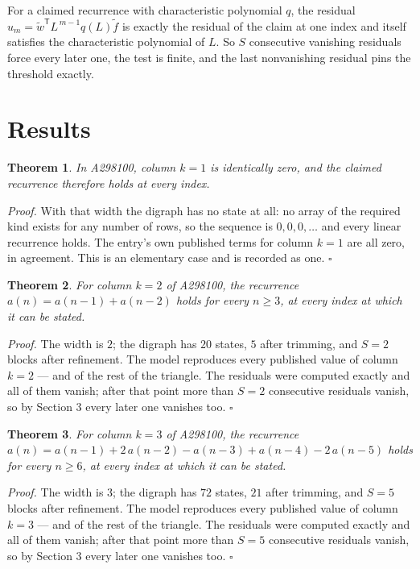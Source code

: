 \documentclass[11pt]{article}
\newtheorem{theorem}{Theorem}
\theoremstyle{definition}
\begin{document}
For a claimed recurrence with characteristic polynomial $q$, the residual $u_m = \tilde w^{\mathsf T}L^{\,m-1}q(L)\tilde f$ is exactly the residual of the claim at one index and itself satisfies the characteristic polynomial of $L$. So $S$ consecutive vanishing residuals force every later one, the test is finite, and the last nonvanishing residual pins the threshold exactly.

\section{Results}

\begin{theorem} In A298100, column $k = 1$ is identically zero, and the claimed recurrence therefore holds at every index.\end{theorem}

{\itshape Proof.} With that width the digraph has no state at all: no array of the required kind exists for any number of rows, so the sequence is $0,0,0,\dots$ and every linear recurrence holds. The entry's own published terms for column $k = 1$ are all zero, in agreement. This is an elementary case and is recorded as one. $\square$

\begin{theorem} For column $k = 2$ of A298100, the recurrence $a(n) = a(n-1) + a(n-2)$ holds for every $n \ge 3$, at every index at which it can be stated.\end{theorem}

{\itshape Proof.} The width is $2$; the digraph has $20$ states, $5$ after trimming, and $S = 2$ blocks after refinement. The model reproduces every published value of column $k = 2$ --- and of the rest of the triangle. The residuals were computed exactly and all of them vanish; after that point more than $S = 2$ consecutive residuals vanish, so by Section 3 every later one vanishes too. $\square$

\begin{theorem} For column $k = 3$ of A298100, the recurrence $a(n) = a(n-1) + 2\,a(n-2) - a(n-3) + a(n-4) - 2\,a(n-5)$ holds for every $n \ge 6$, at every index at which it can be stated.\end{theorem}

{\itshape Proof.} The width is $3$; the digraph has $72$ states, $21$ after trimming, and $S = 5$ blocks after refinement. The model reproduces every published value of column $k = 3$ --- and of the rest of the triangle. The residuals were computed exactly and all of them vanish; after that point more than $S = 5$ consecutive residuals vanish, so by Section 3 every later one vanishes too. $\square$
\end{document}
